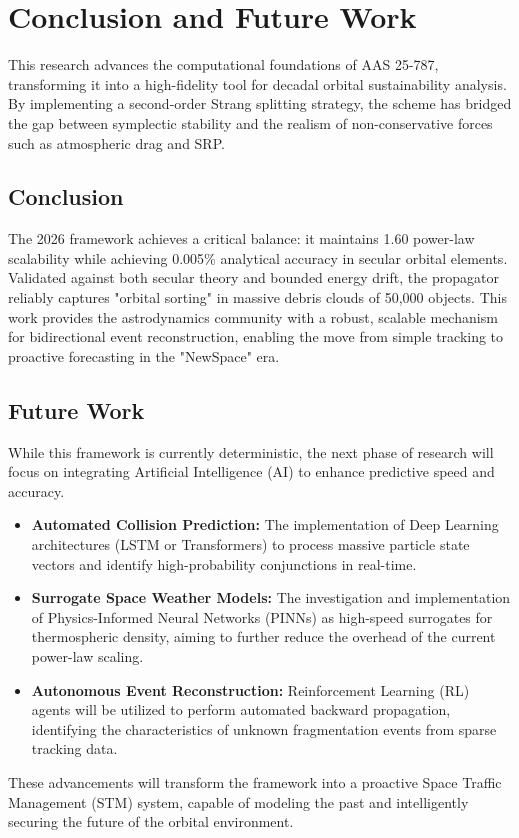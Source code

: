 \documentclass[letterpaper,11pt]{AAS}
\begin{document}
\section{Conclusion and Future Work}
This research advances the computational foundations of AAS 25-787, transforming it into a high-fidelity tool for decadal orbital sustainability analysis. By implementing a second-order Strang splitting strategy, the scheme has bridged the gap between symplectic stability and the realism of non-conservative forces such as atmospheric drag and SRP.

\subsection{Conclusion}
The 2026 framework achieves a critical balance: it maintains 1.60 power-law scalability while achieving 0.005\% analytical accuracy in secular orbital elements. Validated against both secular theory and bounded energy drift, the propagator reliably captures "orbital sorting" in massive debris clouds of 50,000 objects. This work provides the astrodynamics community with a robust, scalable mechanism for bidirectional event reconstruction, enabling the move from simple tracking to proactive forecasting in the "NewSpace" era.

\subsection{Future Work}
While this framework is currently deterministic, the next phase of research will focus on integrating Artificial Intelligence (AI) to enhance predictive speed and accuracy.
\begin{itemize}
    \item \textbf{Automated Collision Prediction:} The implementation of Deep Learning architectures (LSTM or Transformers) to process massive particle state vectors and identify high-probability conjunctions in real-time.
    \item \textbf{Surrogate Space Weather Models:} The investigation and implementation of Physics-Informed Neural Networks (PINNs) as high-speed surrogates for thermospheric density, aiming to further reduce the overhead of the current power-law scaling.
    \item \textbf{Autonomous Event Reconstruction:} Reinforcement Learning (RL) agents will be utilized to perform automated backward propagation, identifying the characteristics of unknown fragmentation events from sparse tracking data.
\end{itemize}
These advancements will transform the framework into a proactive Space Traffic Management (STM) system, capable of modeling the past and intelligently securing the future of the orbital environment.



\end{document}
